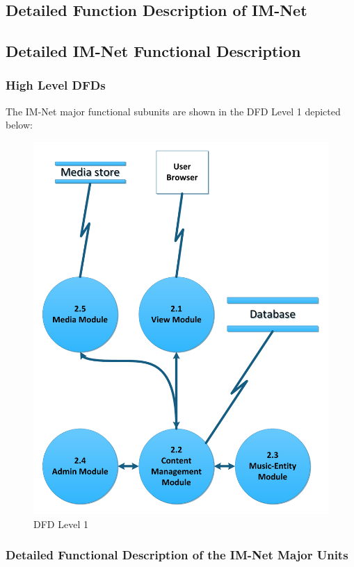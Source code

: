 \documentclass[letterpaper,12pt]{article}
\newcommand{\Section}[1]{\section{#1} \setcounter{figure}{0}}
\begin{document}
{\eject

\textcolor{section}{\Section{Detailed Function Description of IM-Net}}

\textcolor{subsection}{\subsection{Detailed IM-Net Functional Description}}

\textcolor{subsubsection}{\subsubsection{High Level DFDs}}

The IM-Net major functional subunits are shown in the DFD Level 1 depicted below:

\begin{figure}[h!]
\centering
\includegraphics[scale=0.6]{DFD_level_1.pdf}
\caption{DFD Level 1}
\label{fig:DFD_level_1}
\end{figure}
 
\textcolor{subsubsection}{\subsubsection{Detailed Functional Description of the IM-Net Major Units}}

}
\end{document}
